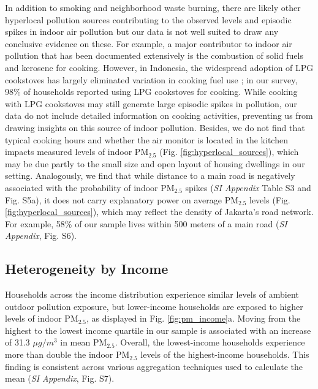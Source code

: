 \documentclass[9pt,twocolumn,twoside]{pnas-new}
\begin{document}
In addition to smoking and neighborhood waste burning, there are likely other hyperlocal pollution sources contributing to the observed levels and episodic spikes in indoor air pollution but our data is not well suited to draw any conclusive evidence on these. For example, a major contributor to indoor air pollution that has been documented extensively is the combustion of solid fuels and kerosene for cooking. However, in Indonesia, the widespread adoption of LPG cookstoves has largely eliminated variation in cooking fuel use \citep{astuti_successful_2019}; in our survey, 98\% of households reported using LPG cookstoves for cooking. While cooking with LPG cookstoves may still generate large episodic spikes in pollution, our data do not include detailed information on cooking activities, preventing us from drawing insights on this source of indoor pollution. Besides, we do not find that typical cooking hours and whether the air monitor is located in the kitchen impacts measured levels of indoor PM$_{2.5}$ (Fig. \ref{fig:hyperlocal_sources}), which may be due partly to the small size and open layout of housing dwellings in our setting. 
Analogously, we find that while distance to a main road is negatively associated with the probability of indoor PM$_{2.5}$ spikes (\textit{SI Appendix} Table S3 and Fig. S5a), it does not carry explanatory power on average PM$_{2.5}$ levels (Fig. \ref{fig:hyperlocal_sources}), which may reflect the density of Jakarta’s road network. For example, 58\% of our sample lives within 500 meters of a main road (\textit{SI Appendix}, Fig. S6).


\subsection{Heterogeneity by Income}

Households across the income distribution experience similar levels of ambient outdoor pollution exposure, but lower-income households are exposed to higher levels of indoor PM$_{2.5}$, as displayed in Fig. \ref{fig:pm_income}a. Moving from the highest to the lowest income quartile in our sample is associated with an increase of 31.3 $\mu g/m^3$ in mean PM$_{2.5}$. Overall, the lowest-income households experience more than double the indoor PM$_{2.5}$ levels of the highest-income households. This finding is consistent across various aggregation techniques used to calculate the mean (\textit{SI Appendix}, Fig. S7).
\end{document}
